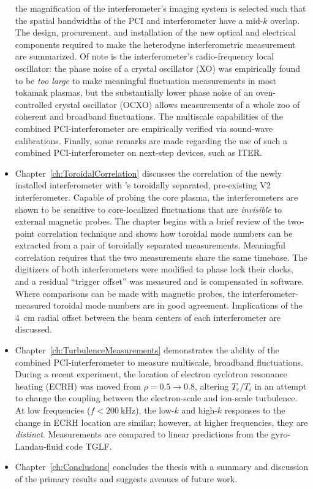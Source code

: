 \begin{itemize}
    the magnification of the interferometer's imaging system
    is selected such that the spatial bandwidths
    of the PCI and interferometer have a mid-$k$ overlap.
    The design, procurement, and installation
    of the new optical and electrical components
    required to make the heterodyne interferometric measurement
    are summarized.
    Of note is the interferometer's radio-frequency local oscillator:
    the phase noise of a crystal oscillator (XO)
    was empirically found to be \emph{too large}
    to make meaningful fluctuation measurements in most tokamak plasmas, but
    the substantially lower phase noise of an
    oven-controlled crystal oscillator (OCXO)
    allows measurements of a whole zoo
    of coherent and broadband fluctuations.
    The multiscale capabilities of the combined PCI-interferometer
    are empirically verified via sound-wave calibrations.
    Finally, some remarks are made regarding
    the use of such a combined PCI-interferometer
    on next-step devices, such as ITER.
  \item Chapter~\ref{ch:ToroidalCorrelation} discusses the correlation
    of the newly installed interferometer with
    \diiid's toroidally separated, pre-existing V2 interferometer.
    Capable of probing the core plasma,
    the interferometers are shown to be sensitive
    to core-localized fluctuations
    that are \emph{invisible} to external magnetic probes.
    The chapter begins with a brief review
    of the two-point correlation technique and
    shows how toroidal mode numbers can be extracted
    from a pair of toroidally separated measurements.
    Meaningful correlation requires that
    the two measurements share the same timebase.
    The digitizers of both interferometers were modified
    to phase lock their clocks, and
    a residual ``trigger offset'' was measured
    and is compensated in software.
    Where comparisons can be made with magnetic probes,
    the interferometer-measured toroidal mode numbers
    are in good agreement.
    Implications of the \SI{4}{\centi\meter} radial offset
    between the beam centers of each interferometer are discussed.
  \item Chapter~\ref{ch:TurbulenceMeasurements} demonstrates
    the ability of the combined PCI-interferometer
    to measure multiscale, broadband fluctuations.
    During a recent \diiid\space experiment,
    the location of electron cyclotron resonance heating (ECRH)
    was moved from $\rho = 0.5 \rightarrow 0.8$,
    altering $T_e / T_i$
    in an attempt to change the coupling between
    the electron-scale and ion-scale turbulence.
    At low frequencies ($f < \SI{200}{\kilo\hertz}$),
    the low-$k$ and high-$k$ responses to the change in ECRH location
    are similar;
    however, at higher frequencies, they are \emph{distinct}.
    Measurements are compared to linear predictions
    from the gyro-Landau-fluid code TGLF.
  \item Chapter~\ref{ch:Conclusions} concludes the thesis
    with a summary and discussion of the primary results
    and suggests avenues of future work.
\end{itemize}


